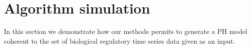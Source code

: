 
\section{Algorithm simulation}
\label{algo_but}

In this section we demonstrate how our methode permits to generate a PH model coherent to the set of biological regulatory time series data given as an input. 



